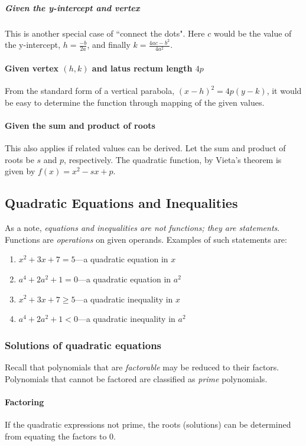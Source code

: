 \subparagraph{Given the y-intercept and vertex}
This is another special case of ``connect the dots".
Here $c$ would be the value of the y-intercept, $h = \frac{-b}{2a}$, and finally $k = \frac{4ac-b^2}{4a^2}$.

\paragraph{Given vertex $(h, k)$ and latus rectum length $4p$}
From the standard form of a vertical parabola, $(x-h)^2 = 4p(y-k)$, it would be easy to determine the function through mapping of the given values.

\paragraph{Given the sum and product of roots}
This also applies if related values can be derived.
Let the sum and product of roots be $s$ and $p$, respectively.
The quadratic function, by Vieta's theorem is given by $f(x) = x^2 - sx + p$.

\subsection{Quadratic Equations and Inequalities}
As a note, \emph{equations and inequalities are not functions; they are statements}.
Functions are \emph{operations} on given operands.
Examples of such statements are:
\begin{enumerate}
    \item $x^2 + 3x + 7 = 5$---a quadratic equation in $x$
    \item $a^4 + 2a^2 + 1 = 0$---a quadratic equation in $a^2$
    \item $x^2 + 3x + 7 \geq 5$---a quadratic inequality in $x$
    \item $a^4 + 2a^2 + 1 < 0$---a quadratic inequality in $a^2$
\end{enumerate}

\subsubsection{Solutions of quadratic equations}
Recall that polynomials that are \emph{factorable} may be reduced to their factors.
Polynomials that cannot be factored are classified as \emph{prime} polynomials.

\paragraph{Factoring}
If the quadratic expressions not prime, the roots (solutions) can be determined from equating the factors to $0$.

